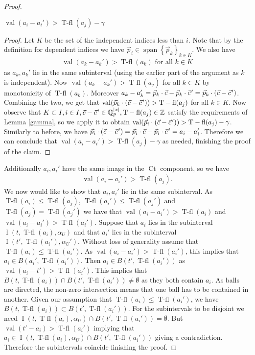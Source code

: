 \documentclass{amsart}
\newcommand{\curly}[1]{\left\{#1\right\}}
\DeclareMathOperator{\Ct}{Ct}
\DeclareMathOperator{\vecspan}{span}
\DeclareMathOperator{\val}{val}
\DeclareMathOperator{\vval}{val}
\DeclareMathOperator{\tfl}{T-fl}
\DeclareMathOperator{\inti}{I}
\begin{document}
\begin{proof}
  \begin{Claim}
    $\val(a_i - a_i') > \tfl(a_j) - \gamma$
  \end{Claim}
  \begin{proof}
    Let $K$ be the set of the independent indices less than $i$.
    Note that by the definition for dependent indices we have $\vec p_i \in \vecspan \curly{\vec p_k}_{k \in K}$.
    We also have 
    \begin{align*}
      \val(a_k - a_k') > \tfl(a_k) \text { for all } k \in K
    \end{align*}
    as $a_k, a_k'$ lie in the same subinterval (using the earlier part of the argument as $k$ is independent).
    Now $\val(a_k - a_k') > \tfl(a_j)$  for all $k \in K$ by monotonicity of $\tfl(a_k)$.
    Moreover $a_k - a_k' = \vec p_k \cdot \vec c - \vec p_k \cdot \pvec c' = \vec p_k \cdot (\vec c - \pvec {c}')$.
    Combining the two, we get that $\val(\vec p_k \cdot (\vec c - \pvec {c}')) > \tfl(a_j)$ for all $k \in K$.
    Now observe that $K \subset I, i \in I, \vec c - \pvec {c}' \in \Q_p^{|x|}, \tfl(a_j) \in \Z$
    satisfy the requirements of Lemma \ref {gamma}, so we apply it to obtain
    $\val(\vec p_i \cdot (\vec c - \pvec {c}')) > \tfl(a_j) - \gamma$.
    Similarly to before, we have $\vec p_i \cdot (\vec c - \pvec {c}') = \vec p_i \cdot \vec c - \vec p_i \cdot \pvec {c}' = a_i - a_i'$.
    Therefore we can conclude that $\val(a_i - a_i') > \tfl(a_j) - \gamma$
    as needed, finishing the proof of the claim.
  \end{proof}	
  Additionally $a_i, a_i'$ have the same image in the $\Ct$ component, so we have
  \begin{align*}
    \val(a_i - a_i') > \tfl(a_j).
  \end{align*}
  We now would like to show that $a_i, a_i'$ lie in the same subinterval.
  As $\tfl(a_i) \leq \tfl(a_j)$, $\tfl(a_i') \leq \tfl(a_j')$ and $\tfl(a_j) = \tfl(a_j')$ we have that
  $\val(a_i - a_i') > \tfl(a_i)$ and $\val(a_i - a_i') > \tfl(a_i')$.
  Suppose that $a_i$ lies in the subinterval $\inti(t, \tfl(a_i), \alpha_U)$
  and that $a_i'$ lies in the subinterval $\inti(t', \tfl(a_i'), \alpha_U')$.
  Without loss of generality assume that $\tfl(a_i) \leq \tfl(a_i')$.
  As $\val(a_i - a_i') > \tfl(a_i')$, this implies that $a_i \in B(a_i', \tfl(a_i'))$.
  Then $a_i \in B(t', \tfl(a_i'))$ as $\vval(a_i - t') > \tfl(a_i')$.
  This implies that $B(t, \tfl(a_i)) \cap B(t', \tfl(a_i')) \neq \emptyset$ as they both contain $a_i$.
  As balls are directed, the non-zero intersection means that one ball has to be contained in another.
  Given our assumption that $\tfl(a_i) \leq \tfl(a_i')$, we have $B(t, \tfl(a_i)) \subset B(t', \tfl(a_i'))$.
  For the subintervals to be disjoint we need 
  $\inti(t, \tfl(a_i), \alpha_U) \cap B(t', \tfl(a_i')) = \emptyset$.
  But $\val(t' - a_i) > \tfl(a_i')$ implying that $a_i \in \inti(t, \tfl(a_i), \alpha_U) \cap B(t', \tfl(a_i'))$ giving a contradiction.
  Therefore the subintervals coincide finishing the proof.
\end{proof}
\end{document}
